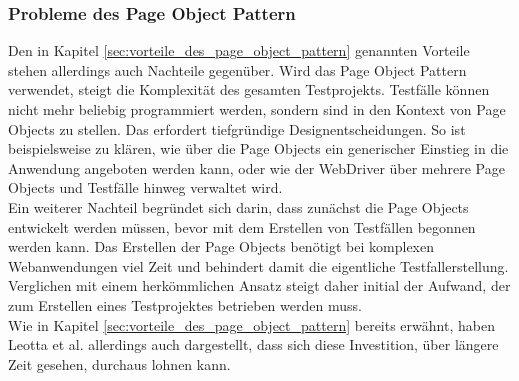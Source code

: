 \subsubsection{Probleme des Page Object Pattern}
\label{sec:probleme_des_page_object_pattern}

Den in Kapitel \ref{sec:vorteile_des_page_object_pattern} genannten Vorteile stehen allerdings auch Nachteile gegenüber. Wird das Page Object Pattern verwendet, steigt die Komplexität des gesamten Testprojekts. Testfälle können nicht mehr beliebig programmiert werden, sondern sind in den Kontext von Page Objects zu stellen. Das erfordert tiefgründige Designentscheidungen. So ist beispielsweise zu klären, wie über die Page Objects ein generischer Einstieg in die Anwendung angeboten werden kann, oder wie der WebDriver über mehrere Page Objects und Testfälle hinweg verwaltet wird.\\
Ein weiterer Nachteil begründet sich darin, dass zunächst die Page Objects entwickelt werden müssen, bevor mit dem Erstellen von Testfällen begonnen werden kann. Das Erstellen der Page Objects benötigt bei komplexen Webanwendungen viel Zeit und behindert damit die eigentliche Testfallerstellung.\\
Verglichen mit einem herkömmlichen Ansatz steigt daher initial der Aufwand, der zum Erstellen eines Testprojektes betrieben werden muss.\\
Wie in Kapitel \ref{sec:vorteile_des_page_object_pattern} bereits erwähnt, haben 
Leotta et al. \cite{leotta_repairing_2013} allerdings auch dargestellt, dass sich diese Investition, über längere Zeit gesehen, durchaus lohnen kann.
